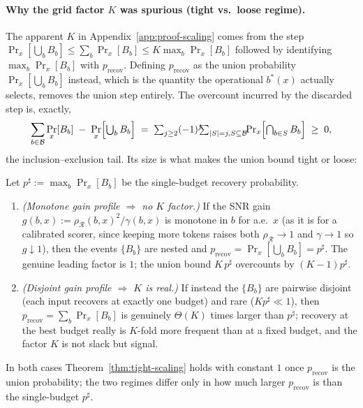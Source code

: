 \paragraph{Why the grid factor $K$ was spurious (tight vs.\ loose regime).}
The apparent $K$ in Appendix~\ref{app:proof-scaling} comes from the step
$\Pr_x[\bigcup_b B_b]\le\sum_b\Pr_x[B_b]\le K\max_b\Pr_x[B_b]$ followed by
identifying $\max_b\Pr_x[B_b]$ with $p_{\mathrm{recov}}$. Defining
$p_{\mathrm{recov}}$ as the union probability $\Pr_x[\bigcup_b B_b]$
instead, which is the quantity the operational $b^*(x)$ actually selects, removes
the union step entirely. The overcount incurred by the discarded step is,
exactly,
\begin{equation}
\label{eq:union-overcount}
\sum_{b\in\mathcal{B}}\Pr_x[B_b] \;-\; \Pr_x\Bigl[\textstyle\bigcup_b B_b\Bigr]
\;=\; \sum_{j\ge2}(-1)^j\!\!\!\sum_{|S|=j, S\subseteq\mathcal{B}}\!\!\Pr_x\Bigl[\textstyle\bigcap_{b\in S}B_b\Bigr]
\;\ge\;0,
\end{equation}
the inclusion--exclusion tail. Its size is what makes the union bound tight or
loose:
\begin{corollary}
\label{cor:grid-tight}
Let $p^\sharp:=\max_b\Pr_x[B_b]$ be the single-budget recovery probability.
\begin{enumerate}
\item[\emph{(i)}] \emph{(Monotone gain profile $\Rightarrow$ no $K$ factor.)}
If the SNR gain $g(b,x):=\rho_{\mathcal{R}}(b,x)^2/\gamma(b,x)$ is monotone in
$b$ for a.e.\ $x$ (as it is for a calibrated scorer, since keeping more tokens
raises both $\rho_{\mathcal{R}}\to1$ and $\gamma\to1$ so $g\downarrow1$), then
the events $\{B_b\}$ are nested and
$p_{\mathrm{recov}}=\Pr_x[\bigcup_b B_b]=p^\sharp$. The genuine leading factor
is $1$; the union bound $K\,p^\sharp$ overcounts by $(K-1)p^\sharp$.
\item[\emph{(ii)}] \emph{(Disjoint gain profile $\Rightarrow$ $K$ is real.)}
If instead the $\{B_b\}$ are pairwise disjoint (each input recovers at exactly
one budget) and rare ($Kp^\sharp\ll1$), then
$p_{\mathrm{recov}}=\sum_b\Pr_x[B_b]$ is genuinely $\Theta(K)$ times larger
than $p^\sharp$; recovery at the best budget really is $K$-fold more frequent
than at a fixed budget, and the factor $K$ is not slack but signal.
\end{enumerate}
In both cases Theorem~\ref{thm:tight-scaling} holds with constant $1$ once
$p_{\mathrm{recov}}$ is the union probability; the two regimes differ only in
how much larger $p_{\mathrm{recov}}$ is than the single-budget $p^\sharp$.
\end{corollary}

